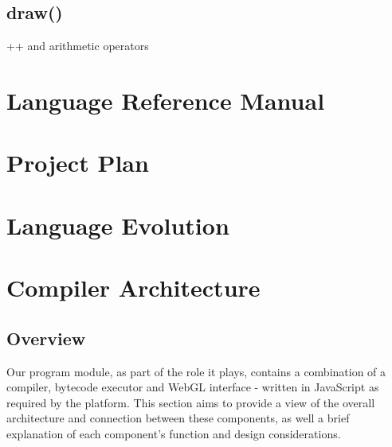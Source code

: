 \documentclass{l3proj}
\begin{document}
\section{draw()}
++ and arithmetic operators



\chapter{Language Reference Manual}
\label{manual}

\chapter{Project Plan}
\label{plan}

\chapter{Language Evolution}
\label{evo}

\chapter{Compiler Architecture}
\label{arch}

\section{Overview}
\label{arch-over}

Our program module, as part of the role it plays, contains a combination of a compiler, bytecode executor and WebGL interface - written in JavaScript as required by the platform. This section aims to provide a view of the overall architecture and connection between these components, as well a brief explanation of each component's function and design considerations.
\end{document}
